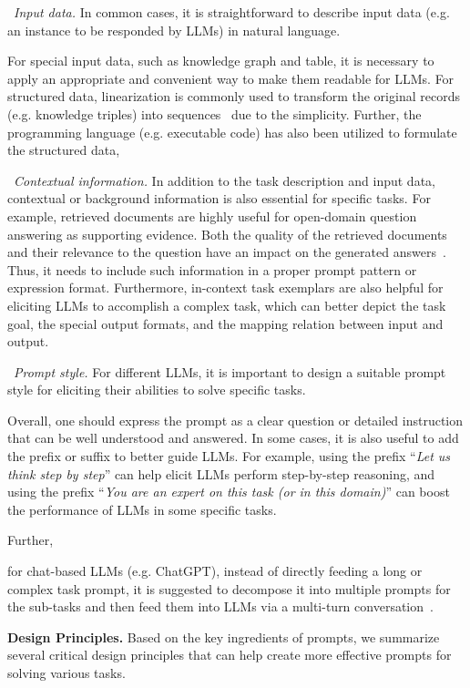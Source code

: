 {{{\textbullet~\emph{Input data.} In common cases, it is straightforward to describe input data (e.g. an instance to be responded by LLMs) in natural language. 

For special input data, such as knowledge graph and table, it is necessary to {apply an appropriate and convenient way} to make them readable for LLMs. For structured data, linearization is commonly used to transform the original records (e.g. knowledge triples) into sequences~\cite{Jiang-2023-arxiv-StructGPT} due to the simplicity. Further, the programming language (e.g. executable code) has also been utilized to formulate the structured data,  

\textbullet~\emph{Contextual information.} In addition to the task description and input data, contextual or background information is also essential for specific tasks. For example, retrieved documents are highly useful for open-domain question answering as supporting evidence. Both the quality of the retrieved documents and their relevance to the question have an impact on the generated answers~\cite{Ren-arxiv-2023-Investigating}. Thus, it needs to include such information in a proper prompt pattern or expression format. Furthermore, in-context task exemplars are also helpful for eliciting LLMs to accomplish a complex task, which can better depict the task goal, {the special output formats, and the mapping relation between input and output.}

\textbullet~\emph{{Prompt} style.} For different LLMs, it is important to design a suitable prompt style for eliciting their abilities to solve specific tasks. 

Overall, one should express the prompt as a clear question or detailed instruction that can be well understood and  answered. In some cases, it is also useful to add the {prefix or suffix} to better guide LLMs. For example, using the prefix ``\emph{Let us think step by step}'' can help elicit LLMs perform step-by-step reasoning, and using the prefix ``\emph{You are an expert on this task (or in this domain)}'' can boost the performance of LLMs in some specific tasks. 

Further, 

for chat-based LLMs (e.g. ChatGPT), instead of directly feeding a long or complex task prompt, it is suggested to decompose it into multiple prompts for the sub-tasks and then feed them into LLMs via a multi-turn conversation~\cite{Chen-2023-arXiv-chatcot}.

\textbf{Design Principles.} Based on the key ingredients of prompts, we summarize several critical design principles that can help create more  effective prompts for solving various  tasks.

}}}
